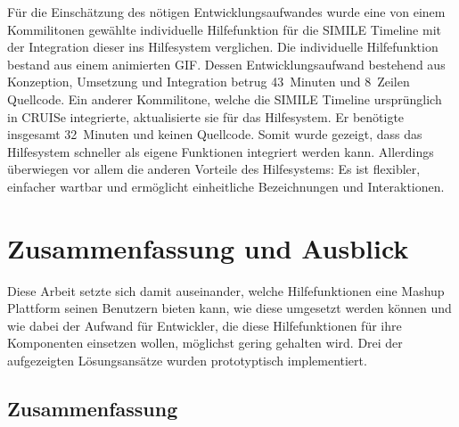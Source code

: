 \documentclass[
	headsepline,
	footsepline,
	fontsize=12pt,
	bibliography=totoc
]{scrbook}
\begin{document}

Für die Einschätzung des nötigen Entwicklungsaufwandes wurde eine von einem Kommilitonen gewählte individuelle Hilfefunktion für die SIMILE Timeline mit der Integration dieser ins Hilfesystem verglichen. Die individuelle Hilfefunktion bestand aus einem animierten GIF. Dessen Entwicklungsaufwand bestehend aus Konzeption, Umsetzung und Integration betrug 43~Minuten und 8~Zeilen Quellcode. Ein anderer Kommilitone, welche die SIMILE Timeline ursprünglich in CRUISe integrierte, aktualisierte sie für das Hilfesystem. Er benötigte insgesamt 32~Minuten und keinen Quellcode. Somit wurde gezeigt, dass das Hilfesystem schneller als eigene Funktionen integriert werden kann. Allerdings überwiegen vor allem die anderen Vorteile des Hilfesystems: Es ist flexibler, einfacher wartbar und ermöglicht einheitliche Bezeichnungen und Interaktionen.

\chapter{Zusammenfassung und Ausblick}
\label{chapter:zusammenfassung}

Diese Arbeit setzte sich damit auseinander, welche Hilfefunktionen eine Mashup Plattform seinen Benutzern bieten kann, wie diese umgesetzt werden können und wie dabei der Aufwand für Entwickler, die diese Hilfefunktionen für ihre Komponenten einsetzen wollen, möglichst gering gehalten wird. Drei der aufgezeigten Lösungsansätze wurden prototyptisch implementiert.

\section{Zusammenfassung}

\end{document}
